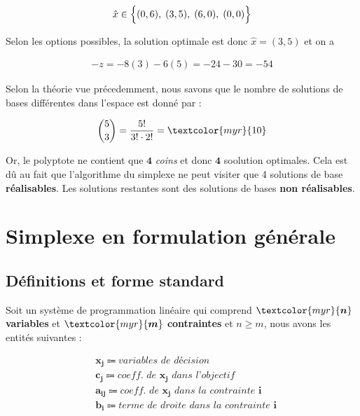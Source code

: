 \documentclass{report}
\begin{document}
\begin{multicols*}{2}
    \begin{align*}
        \hat{x} \in \Bigl\{ (0,6), \; (3,5), \;  (6, 0), \; (0, 0)\Bigr\}
    \end{align*}


    Selon les options possibles, la solution optimale est donc 
    $\hat{x} = (3, 5)$ et on a  

    \begin{align*}
        \boxed{-z = -8(3) - 6(5) = -24 - 30 = -54}
    \end{align*}


    Selon la théorie vue précedemment, nous savons 
    que le nombre de solutions de bases 
    différentes dans l'espace est donné par :

    \begin{align*}
        {5 \choose 3} = 
        \dfrac{5!}{3! \cdot 2!} 
        = \textcolor{myr}{10}  
    \end{align*}

    Or, le polyptote ne contient que 
    $\boldsymbol{4}$ \textit{coins} et donc               $\boldsymbol{4}$ soolution optimales. Cela est 
    dû au fait que l'algorithme du simplexe ne peut 
    visiter que 4 solutions de base 
    \textbf{réalisables}. Les solutions restantes 
    sont des solutions de bases 
    \textbf{non réalisables}. 

    \chapter{Simplexe en formulation générale}



    \section{Définitions et forme standard}
    Soit un système de programmation linéaire qui comprend 
    $\textcolor{myr}{\boldsymbol{n}}$ \textbf{variables} 
    et $\textcolor{myr}{\boldsymbol{m}}$ \textbf{contraintes} et 
    $n \geq m$, nous avons les entités suivantes :

    \begin{align*}
        &\boldsymbol{x_j} \Coloneqq \textit{variables de décision} \\   
        &\boldsymbol{c_j} \Coloneqq \textit{coeff. de } \boldsymbol{x_j}  \textit{ dans l'objectif}  \\  
        &\boldsymbol{a_{ij}} \Coloneqq \textit{coeff. de } \boldsymbol{x_j} \textit{ dans la contrainte } \boldsymbol{i} \\  
        &\boldsymbol{b_i} \Coloneqq \textit{terme de droite dans la contrainte } \boldsymbol{i}
    \end{align*}


\end{multicols*}
\end{document}

